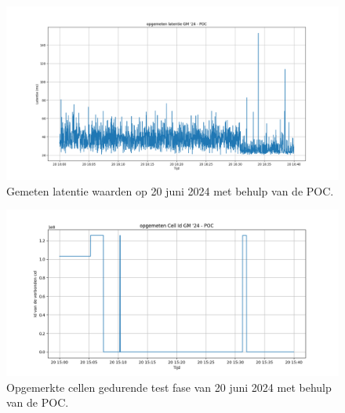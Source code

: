 \begin{figure}[!htb]
    \includegraphics[width=1.2\linewidth]{graphics/latency_graph_40min_POC}
    \caption[Gemeten latentie waarden op 20 juni 2024 met behulp van de POC.]{Gemeten latentie waarden op 20 juni 2024 met behulp van de POC.}
    \label{fig:Lat_POC}
\end{figure}

\begin{figure}[!htb]
    \includegraphics[width=1.2\linewidth]{graphics/CellId_graph_40min_POC}
    \caption[Opgemerkte cellen gedurende test fase van 20 juni 2024 met behulp van de POC.]{Opgemerkte cellen gedurende test fase van 20 juni 2024 met behulp van de POC.}
    \label{fig:CI_POC}
\end{figure}

